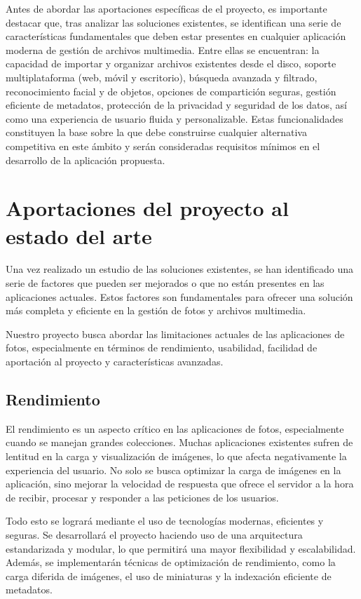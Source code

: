 Antes de abordar las aportaciones específicas de el proyecto, es importante destacar que, tras analizar las soluciones existentes, se identifican una serie de características fundamentales que deben estar presentes en cualquier aplicación moderna de gestión de archivos multimedia. Entre ellas se encuentran: la capacidad de importar y organizar archivos existentes desde el disco, soporte multiplataforma (web, móvil y escritorio), búsqueda avanzada y filtrado, reconocimiento facial y de objetos, opciones de compartición seguras, gestión eficiente de metadatos, protección de la privacidad y seguridad de los datos, así como una experiencia de usuario fluida y personalizable. Estas funcionalidades constituyen la base sobre la que debe construirse cualquier alternativa competitiva en este ámbito y serán consideradas requisitos mínimos en el desarrollo de la aplicación propuesta.

\section{Aportaciones del proyecto al estado del arte}
Una vez realizado un estudio de las soluciones existentes, se han identificado una serie de factores que pueden ser mejorados o que no están presentes en las aplicaciones actuales. Estos factores son fundamentales para ofrecer una solución más completa y eficiente en la gestión de fotos y archivos multimedia.

Nuestro proyecto busca abordar las limitaciones actuales de las aplicaciones de fotos, especialmente en términos de rendimiento, usabilidad, facilidad de aportación al proyecto y características avanzadas.
\subsection{Rendimiento}
El rendimiento es un aspecto crítico en las aplicaciones de fotos, especialmente cuando se manejan grandes colecciones. Muchas aplicaciones existentes sufren de lentitud en la carga y visualización de imágenes, lo que afecta negativamente la experiencia del usuario.
No solo se busca optimizar la carga de imágenes en la aplicación, sino mejorar la velocidad de respuesta que ofrece el servidor a la hora de recibir, procesar y responder a las peticiones de los usuarios.

Todo esto se logrará mediante el uso de tecnologías modernas, eficientes y seguras.
Se desarrollará el proyecto haciendo uso de una arquitectura estandarizada y modular, lo que permitirá una mayor flexibilidad y escalabilidad. Además, se implementarán técnicas de optimización de rendimiento, como la carga diferida de imágenes, el uso de miniaturas y la indexación eficiente de metadatos.
